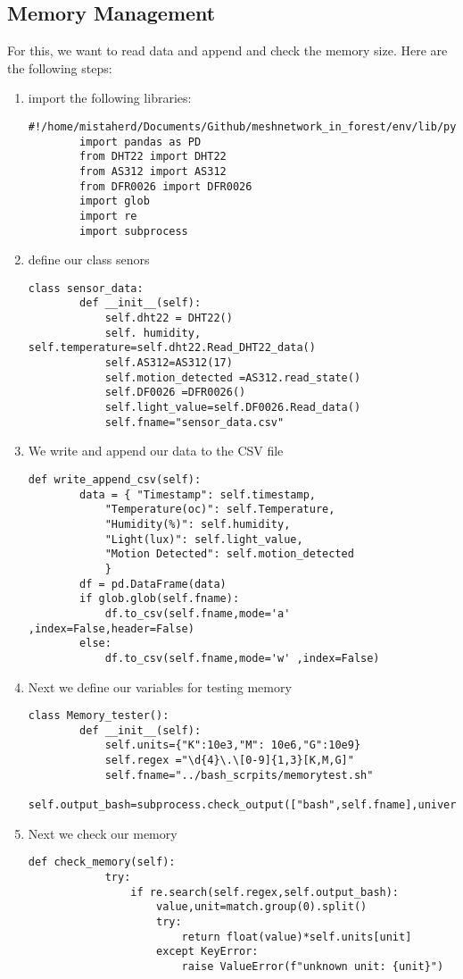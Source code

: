 \subsection{Memory Management}
For this, we want to read data and append and check the memory size. Here are the following steps:
\begin{enumerate}
    \item  import the following  libraries:
    \begin{lstlisting}[style=mystyle]
        #!/home/mistaherd/Documents/Github/meshnetwork_in_forest/env/lib/python3.11
        import pandas as PD
        from DHT22 import DHT22
        from AS312 import AS312
        from DFR0026 import DFR0026
        import glob
        import re 
        import subprocess
    \end{lstlisting}
    \item define our class  senors
    \begin{lstlisting}[style=mystyle]
    class sensor_data:
        def __init__(self):
            self.dht22 = DHT22()
            self. humidity, self.temperature=self.dht22.Read_DHT22_data()
            self.AS312=AS312(17)
            self.motion_detected =AS312.read_state()
            self.DF0026 =DFR0026()
            self.light_value=self.DF0026.Read_data()
            self.fname="sensor_data.csv"
    \end{lstlisting}
    \item We write and append our data to  the CSV file
    \begin{lstlisting}[style=mystyle]
        def write_append_csv(self):
		data = { "Timestamp": self.timestamp,
			"Temperature(oc)": self.Temperature,
			"Humidity(%)": self.humidity,
			"Light(lux)": self.light_value,
			"Motion Detected": self.motion_detected
			}
		df = pd.DataFrame(data)
		if glob.glob(self.fname):	
			df.to_csv(self.fname,mode='a' ,index=False,header=False)
		else:
			df.to_csv(self.fname,mode='w' ,index=False)
    \end{lstlisting}
    \newpage
    \item Next we define our variables for testing  memory
    \begin{lstlisting}[style=mystyle]
    class Memory_tester():
        def __init__(self):
            self.units={"K":10e3,"M": 10e6,"G":10e9}
            self.regex ="\d{4}\.\[0-9]{1,3}[K,M,G]"
            self.fname="../bash_scrpits/memorytest.sh" 
            self.output_bash=subprocess.check_output(["bash",self.fname],universal_newlines=True)
    \end{lstlisting}
    \item Next we check our memory
    \begin{lstlisting}[style=mystyle]
        def check_memory(self):
            try:
                if re.search(self.regex,self.output_bash):
                    value,unit=match.group(0).split()
                    try:
                        return float(value)*self.units[unit]
                    except KeyError:
                        raise ValueError(f"unknown unit: {unit}")
                

\end{lstlisting}
\end{enumerate}

